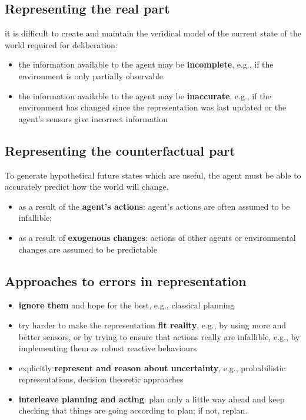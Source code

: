 \documentclass{article}
\begin{document}
\subsection{Representing the real part}
\begin{flushleft}
it is difficult to create and maintain the veridical model of the current state of the world required for deliberation:
\begin{itemize}
  \item the information available to the agent may be \textbf{incomplete}, e.g., if the environment is only partially observable
  \item the information available to the agent may be \textbf{inaccurate}, e.g., if the environment has changed since the representation was last updated or the agent’s sensors give incorrect information
\end{itemize}
\end{flushleft}

\subsection{Representing the counterfactual part}
\begin{flushleft}
To generate hypothetical future states which are useful, the agent must be able to accurately predict how the world will change.
\begin{itemize}
  \item as a result of the \textbf{agent’s actions}: agent’s actions are often assumed to be infallible;
  \item as a result of \textbf{exogenous changes}: actions of other agents or environmental changes are assumed to be predictable
\end{itemize}
\end{flushleft}

\subsection{Approaches to errors in representation}
\begin{itemize}
  \item \textbf{ignore them} and hope for the best, e.g., classical planning 
  \item try harder to make the representation \textbf{fit reality}, e.g., by using more and better sensors, or by trying to ensure that actions really are infallible, e.g., by implementing them as robust reactive behaviours 
  \item explicitly \textbf{represent and reason about uncertainty}, e.g., probabilistic representations, decision theoretic approaches 
  \item \textbf{interleave planning and acting}: plan only a little way ahead and keep checking that things are going according to plan; if not, replan.
\end{itemize}
\end{document}
